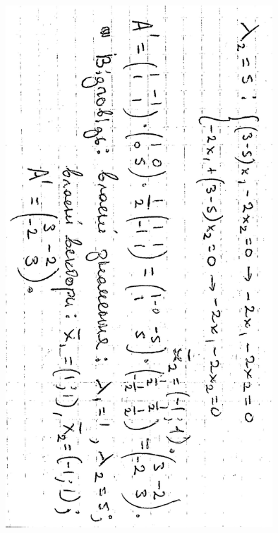 \documentclass{article}
\begin{document}
\includegraphics[width=10cm,angle=90]{ons/18.jpg}\\
\end{document}
